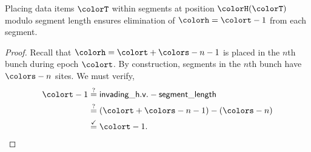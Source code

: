 \begin{lemma}[Placements Overwrite Hanoi Value $\colorh = \colort - 1$]
Placing data items $\colorT$ within segments at position $\colorH(\colorT)$ modulo segment length ensures elimination of \hv{} $\colorh = \colort - 1$ from each segment.
\end{lemma} \label{thm:steady-hv-elimination}
\begin{proof}
Recall that \hv{} $\colorh = \colort + \colors - n - 1$ is placed in the $n$th bunch during epoch $\colort$.
By construction, segments in the $n$th bunch have $\colors - n$ sites.
We must verify,
\begin{align*}
\colort - 1
&\stackrel{?}{=}
\mathsf{invading\_h.v.} - \mathsf{segment\_length}\\
&\stackrel{?}{=}
(\colort + \colors - n - 1) - (\colors - n)
 \\
&\stackrel{\checkmark}{=} \colort - 1.
\end{align*}
\end{proof}

